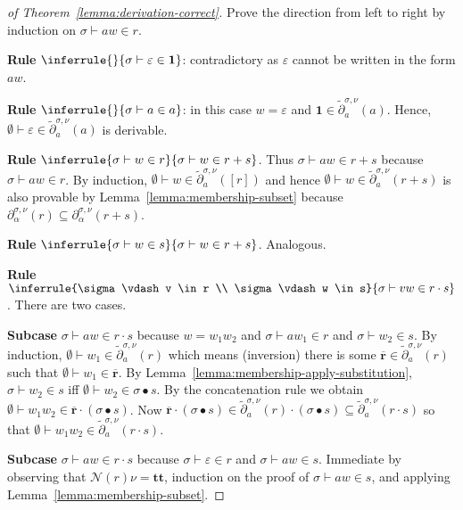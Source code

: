 \documentclass[runningheads, envcountsame, a4paper]{llncs}
\newcommand{\True}{\ensuremath{\mathbf{tt}}}%
\newcommand\pderiv[3][{}]{\partial^{#1}_{#3}(#2)}
\newcommand\cderiv[3][{}]{\tilde\partial^{#1}_{#3}(#2)}
\newcommand\Rempty{\mathbf1}
\newcommand\SINGLETON[1]{{[#1]}}
\newcommand\Null{\mathcal{N}}
\newcommand\RS{\ensuremath{\overline{\mathbf{r}}}}
\newcommand\ApplySubst[2]{#1 \bullet #2} %
\begin{document}
\begin{proof}[of Theorem~\ref{lemma:derivation-correct}]
  Prove the direction from left to right by induction on $\sigma
  \vdash aw \in r$. 

  \textbf{Rule }$\inferrule{}{\sigma \vdash \varepsilon \in \Rempty}$:
  contradictory as $\varepsilon$ cannot be written in the form $aw$.

  \textbf{Rule }$\inferrule{}{\sigma \vdash a \in a}$: in this case
  $w=\varepsilon$ and $\Rempty\in \cderiv[\sigma,\nu]{a}{a}$. Hence, $\emptyset
  \vdash \varepsilon \in  \cderiv[\sigma,\nu]{a}{a}$ is 
  derivable.

  \textbf{Rule }$\inferrule{\sigma \vdash w \in r}{\sigma \vdash w \in
    r+s}$.
  Thus $\sigma \vdash aw \in r+s$ because $\sigma \vdash aw \in r$. By
  induction, $\emptyset \vdash w \in \cderiv[\sigma,\nu]{\SINGLETON r}{a}$ and
  hence $\emptyset \vdash w \in \cderiv[\sigma, \nu]{r+s}{a}$ is also
  provable by Lemma~\ref{lemma:membership-subset} because
  $\pderiv[\sigma, \nu]{r}{\alpha} \subseteq \pderiv[\sigma,
  \nu]{r+s}{\alpha}$. 

  \textbf{Rule }$\inferrule{\sigma \vdash w \in s}{\sigma \vdash w \in
    r+s}$. Analogous.

  \textbf{Rule }$\inferrule{\sigma \vdash v \in r \\ \sigma \vdash w \in s}{\sigma
    \vdash vw \in r\cdot s}$. There are two cases.

  \textbf{Subcase }$\sigma \vdash aw \in r\cdot s$ because $w=w_1w_2$
  and $\sigma \vdash aw_1 \in r$ and $\sigma \vdash w_2 \in s$.
  By induction, $\emptyset \vdash w_1 \in \cderiv[\sigma, \nu]{r}{a}$
  which means (inversion) there is some $\RS\in \cderiv[\sigma, \nu]{r}{a}$ such
  that $\emptyset \vdash w_1 \in \RS$. By Lemma~\ref{lemma:membership-apply-substitution},
  $\sigma \vdash w_2 \in s$ iff  $\emptyset \vdash w_2 \in
  \ApplySubst\sigma  s$.
  By the concatenation rule we obtain  $\emptyset \vdash w_1w_2 \in
  \RS \cdot ({\ApplySubst\sigma s})$.
  Now
  $\RS \cdot (\ApplySubst\sigma s) \in \cderiv[\sigma, \nu]{r}{a} \cdot (\ApplySubst\sigma
  s) \subseteq \cderiv[\sigma, \nu]{r\cdot s}{a}$ so that
  $\emptyset \vdash w_1w_2 \in \cderiv[\sigma, \nu]{r\cdot s}{a}$.

  \textbf{Subcase }$\sigma \vdash aw \in r\cdot s$ because $\sigma
  \vdash \varepsilon \in r$ and $\sigma \vdash aw \in s$. Immediate by
  observing that $\Null (r)\nu = \True$,
  induction on the proof of  $\sigma \vdash aw \in s$, and applying
  Lemma~\ref{lemma:membership-subset}.


\end{proof}
\end{document}
